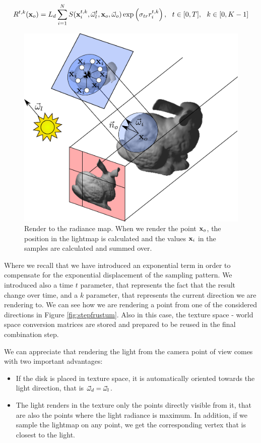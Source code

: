 $$
R^{t,k}(\mathbf{x}_o) = L_d \sum_{i = 1}^N S(\mathbf{x}^{t,k}_i, \vec{\omega}^t_l, \mathbf{x}_o, \vec{\omega}_o) \exp\left(\sigma_{tr} r^{t,k}_i\right), \ \ t \in [0,T], \ \ k \in [0,K-1] 
\label{eq:evolution_step}
$$

\begin{figure}[!ht]
\centering
\includegraphics[width=0.9 \linewidth]{images/method/step2_improved.pdf}
\caption{Render to the radiance map. When we render the point $\mathbf{x}_o$, the position in the lightmap is calculated and the values $\mathbf{x}_i$ in the samples are calculated and summed over.}
\label{fig:step2}
\end{figure} 

Where we recall that we have introduced an exponential term in order to compensate for the exponential displacement of the sampling pattern. We introduced also a time $t$ parameter, that represents the fact that the result change over time, and a $k$ parameter, that represents the current direction we are rendering to. We can see how we are rendering a point from one of the considered directions in Figure \ref{fig:stepfrustum}. Also in this case, the texture space - world space conversion matrices are stored and prepared to be reused in the final combination step. 

We can appreciate that rendering the light from the camera point of view comes with two important advantages:

\begin{itemize}
	\item If the disk is placed in texture space, it is automatically oriented towards the light direction, that is $\vec{\omega}_d = \vec{\omega}_l$.
	\item The light renders in the texture only the points directly visible from it, that are also the points where the light radiance is maximum. In addition, if we sample the lightmap on any point, we get the corresponding vertex that is closest to the light.
\end{itemize}

